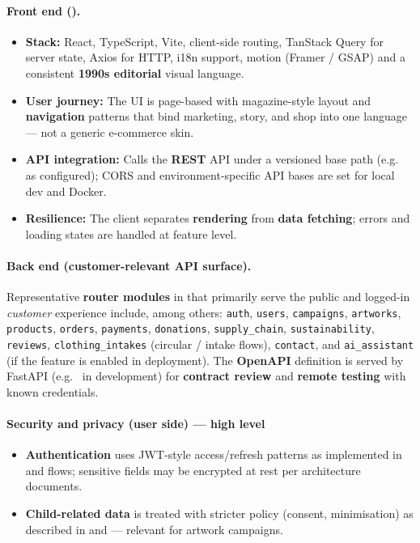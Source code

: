 \documentclass[11pt,a4paper]{article}
\begin{document}
\paragraph{Front end ().}
\begin{itemize}
  \item \textbf{Stack:} React, TypeScript, Vite, client-side routing, TanStack Query for server state, Axios for HTTP, i18n support, motion (Framer / GSAP) and a consistent \textbf{1990s editorial} visual language.
  \item \textbf{User journey:} The UI is page-based with magazine-style layout and \textbf{navigation} patterns that bind marketing, story, and shop into one language --- not a generic e-commerce skin.
  \item \textbf{API integration:} Calls the \textbf{REST} API under a versioned base path (e.g.\  as configured); CORS and environment-specific API bases are set for local dev and Docker.
  \item \textbf{Resilience:} The client separates \textbf{rendering} from \textbf{data fetching}; errors and loading states are handled at feature level.
\end{itemize}

\paragraph{Back end (customer-relevant API surface).}
Representative \textbf{router modules} in  that primarily serve the public and logged-in \emph{customer} experience include, among others: \texttt{auth}, \texttt{users}, \texttt{campaigns}, \texttt{artworks}, \texttt{products}, \texttt{orders}, \texttt{payments}, \texttt{donations}, \texttt{supply\_chain}, \texttt{sustainability}, \texttt{reviews}, \texttt{clothing\_intakes} (circular / intake flows), \texttt{contact}, and \texttt{ai\_assistant} (if the feature is enabled in deployment). The \textbf{OpenAPI} definition is served by FastAPI (e.g.\  in development) for \textbf{contract review} and \textbf{remote testing} with known credentials.

\paragraph{Security and privacy (user side) --- high level}
\begin{itemize}
  \item \textbf{Authentication} uses JWT-style access/refresh patterns as implemented in  and  flows; sensitive fields may be encrypted at rest per architecture documents.
  \item \textbf{Child-related data} is treated with stricter policy (consent, minimisation) as described in  and  --- relevant for artwork campaigns.
\end{itemize}
\end{document}
